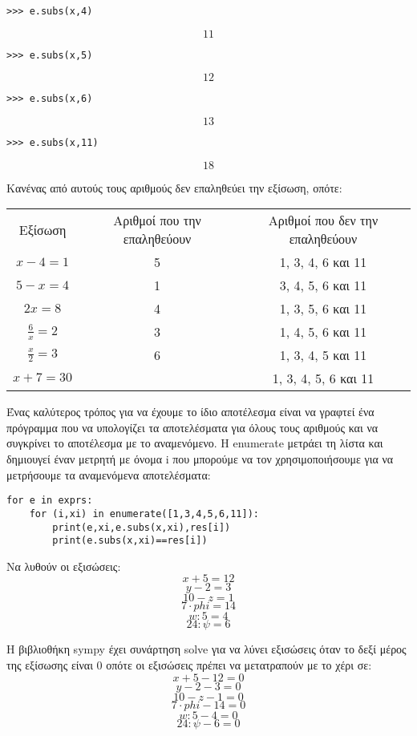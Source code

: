\begin{lstlisting}
>>> e.subs(x,4)
\end{lstlisting}
$$11$$

\begin{lstlisting}
>>> e.subs(x,5)
\end{lstlisting}
$$12$$

\begin{lstlisting}
>>> e.subs(x,6)
\end{lstlisting}
$$13$$
\begin{lstlisting}
>>> e.subs(x,11)
\end{lstlisting}
$$18$$

Κανένας από αυτούς τους αριθμούς δεν επαληθεύει την εξίσωση, οπότε:

\begin{tabular}{|c|c|c|}
Εξίσωση            &Αριθμοί που την επαληθεύουν  &Αριθμοί που δεν την επαληθεύουν\\
$x - 4 = 1$        &            5                &          1, 3, 4, 6 και 11    \\
$5 - x = 4$        &            1                &          3, 4, 5, 6 και 11    \\
$2x = 8$           &            4                &          1, 3, 5, 6 και 11    \\
$\frac{6}{x} = 2$  &            3                &          1, 4, 5, 6 και 11    \\
$\frac{x}{2} = 3$  &            6                &          1, 3, 4, 5 και 11    \\
$x + 7 = 30$       &                             &          1, 3, 4, 5, 6 και 11 \\
\end{tabular}

Ένας καλύτερος τρόπος για να έχουμε το ίδιο αποτέλεσμα είναι να γραφτεί ένα πρόγραμμα που να υπολογίζει τα αποτελέσματα για όλους τους αριθμούς και να συγκρίνει το αποτέλεσμα με το αναμενόμενο. Η enumerate μετράει τη λίστα και δημιουγεί έναν μετρητή με όνομα i που μπορούμε να τον χρησιμοποιήσουμε για να μετρήσουμε τα αναμενόμενα αποτελέσματα:
\begin{lstlisting}
for e in exprs: 
    for (i,xi) in enumerate([1,3,4,5,6,11]):
        print(e,xi,e.subs(x,xi),res[i])
        print(e.subs(x,xi)==res[i])
\end{lstlisting}
\begin{exercise}
Να λυθούν οι εξισώσεις:
$$x+5=12$$
$$y-2=3$$
$$10-z =1$$
$$7\cdot phi = 14$$
$$w:5 = 4$$
$$24:\psi = 6$$
\end{exercise}
Η βιβλιοθήκη sympy έχει συνάρτηση solve για να λύνει εξισώσεις όταν το δεξί μέρος της εξίσωσης είναι 0 οπότε οι εξισώσεις πρέπει να μετατραπούν με το χέρι σε:
$$x+5-12 = 0$$
$$y-2-3 = 0$$
$$10-z -1 = 0$$
$$7\cdot phi - 14 = 0$$
$$w:5 - 4 = 0$$
$$24:\psi - 6 = 0$$

